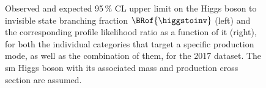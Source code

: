 \begin{figure}[htbp]
    \caption[Observed and expected 95\,\% CL upper limit on the Higgs boson to invisible state branching fraction $\BRof{\higgstoinv}$ and the corresponding profile likelihood ratio as a function of it, for both the individual categories that target a specific production mode, as well as the combination of them, for the 2017 dataset]{Observed and expected 95\,\% CL upper limit on the Higgs boson to invisible state branching fraction $\BRof{\higgstoinv}$ (left) and the corresponding profile likelihood ratio as a function of it (right), for both the individual categories that target a specific production mode, as well as the combination of them, for the 2017 dataset. The \acrlong{sm} Higgs boson with its associated mass and production cross section are assumed.}
    \label{fig:htoinv_limit_likelihood_2017}
\end{figure}

